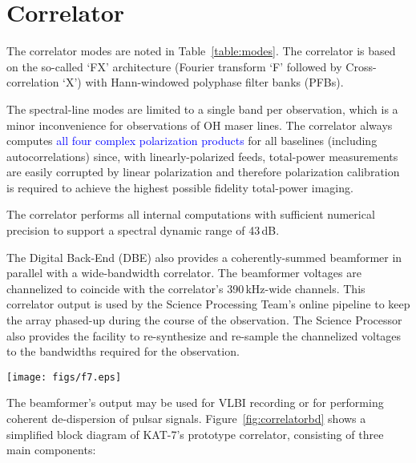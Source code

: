 \section{Correlator}
\label{sec:corr}

\noindent
The correlator modes are noted in Table~\ref{table:modes}.  The
correlator is based on the so-called `FX' architecture (Fourier
transform `F' followed by Cross-correlation `X') with Hann-windowed
polyphase filter banks (PFBs).

The spectral-line modes are limited to a single band per observation,
which is a minor inconvenience for observations of OH maser lines. The
correlator always computes \textcolor{blue}{all four complex
  polarization products} for all baselines (including
autocorrelations) since, with linearly-polarized feeds, total-power
measurements are easily corrupted by linear polarization and therefore
polarization calibration is required to achieve the highest possible
fidelity total-power imaging.

The correlator performs all internal computations with sufficient
numerical precision to support a spectral dynamic range of 43\,dB.

The Digital Back-End (DBE) also provides a coherently-summed
beamformer in parallel with a wide-bandwidth correlator. The
beamformer voltages are channelized to coincide with the correlator's
390\,kHz-wide channels. This correlator output is used by the Science
Processing Team's online pipeline to keep the
array phased-up during the course of the observation. The Science
Processor also provides the facility to re-synthesize and re-sample the
channelized voltages to the bandwidths required for the observation.


\begin{figure*}
\texttt{[image: figs/f7.eps]}
\caption{The KAT-7 Correlator. The signal chain (in black) for two of
  the telescopes is shown, as well of the control and monitoring (in
  red). The F-engines do the Fourier transform and X-engines do the
  correlations. For $n$ antennas there are $\frac{n(n+1)}{2}$
  correlation products if you include all autocorrelations.}
\label{fig:correlatorbd}
\end{figure*}


The beamformer's output may be used for VLBI recording or for
performing coherent de-dispersion of pulsar signals.
Figure~\ref{fig:correlatorbd} shows a simplified block diagram of
KAT-7's prototype correlator, consisting of three main components:

